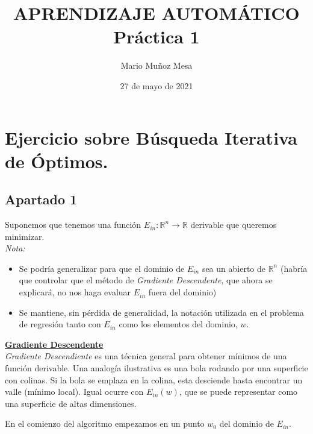 \documentclass[11pt,a4paper]{article}
\title{
\normalfont \normalsize 
\textsc{\small APRENDIZAJE AUTOMÁTICO} \\ [10pt]
	
	
\huge \bf Práctica 1\\


	}
\author{Mario Muñoz Mesa}
\date{27 de mayo de 2021}
\theoremstyle{definition}
\newcommand{\R}{\mathbb{R}}
\begin{document}
	\maketitle
	\renewcommand*\contentsname{Índice}	
	\tableofcontents
	
	\newpage
	

	\section{Ejercicio sobre Búsqueda Iterativa de Óptimos.}
	\subsection{Apartado 1}
	Suponemos que tenemos una función $E_{in}\colon \R^n \to \R$ derivable que queremos minimizar. \\
	\textit{Nota:}
	\begin{itemize}
	\item Se podría generalizar para que el dominio de $E_{in}$ sea un abierto de $\R^n$ (habría que controlar que el método de \textit{Gradiente Descendente}, que ahora se explicará, no nos haga evaluar $E_{in}$ fuera del dominio)
	\item Se mantiene, sin pérdida de generalidad, la notación utilizada en el problema de regresión tanto con $E_{in}$ como los elementos del dominio, $w$.
	\end{itemize}
	
	\underline{\bf Gradiente Descendente}\\
	
	\textit{Gradiente Descendiente} es una técnica general para obtener mínimos de una función derivable. Una analogía ilustrativa es una bola rodando por una superficie con colinas. Si la bola se emplaza en la colina, esta desciende hasta encontrar un valle (mínimo local). Igual ocurre con $E_{in}(w)$, que se puede representar como una superficie de altas dimensiones.
	
	 En el comienzo del algoritmo empezamos en un punto $w_0$ del dominio de $E_{in}$.
	
	
\end{document}

